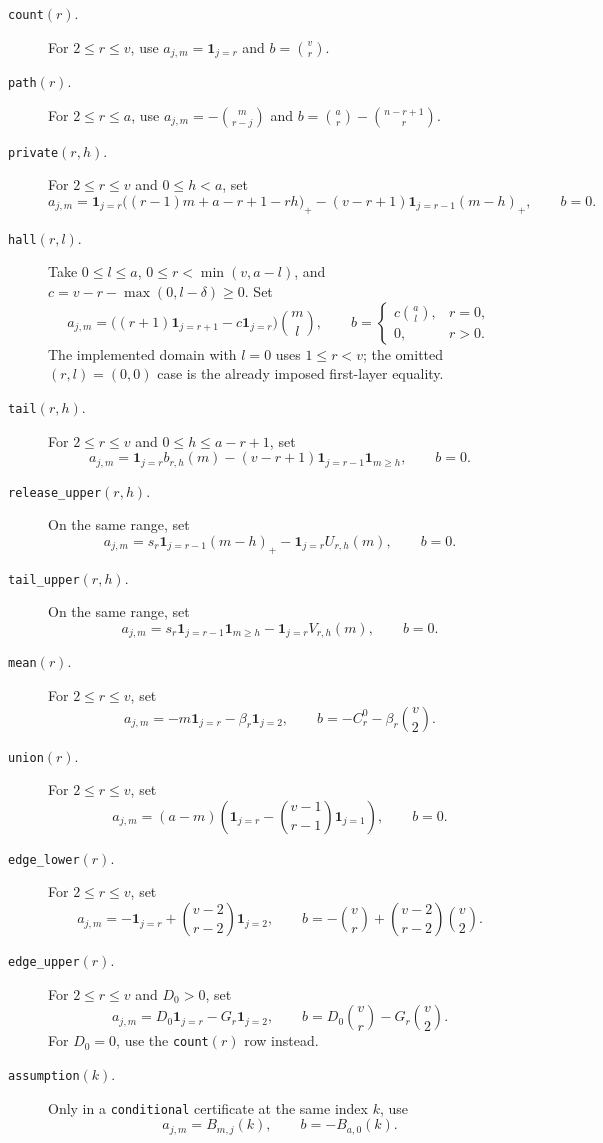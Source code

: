 \begin{description}
\item[\texttt{count}$(r)$.]
For $2\le r\le v$, use
$a_{j,m}=\mathbf{1}_{j=r}$ and $b=\binom vr$.

\item[\texttt{path}$(r)$.]
For $2\le r\le a$, use
$a_{j,m}=-\binom m{r-j}$ and
$b=\binom ar-\binom{n-r+1}{r}$.

\item[\texttt{private}$(r,h)$.]
For $2\le r\le v$ and $0\le h<a$, set
\[
 a_{j,m}=\mathbf{1}_{j=r}\bigl((r-1)m+a-r+1-rh\bigr)_+
 -(v-r+1)\mathbf{1}_{j=r-1}(m-h)_+,
 \qquad b=0.
\]

\item[\texttt{hall}$(r,l)$.]
Take $0\le l\le a$, $0\le r<\min(v,a-l)$, and
$c=v-r-\max(0,l-\delta)\ge0$.  Set
\[
 a_{j,m}=\bigl((r+1)\mathbf{1}_{j=r+1}-c\mathbf{1}_{j=r}\bigr)
                 \binom ml,\qquad
 b=\begin{cases}c\binom al,&r=0,\\0,&r>0.\end{cases}
\]
The implemented domain with $l=0$ uses $1\le r<v$; the omitted
$(r,l)=(0,0)$ case is the already imposed first-layer equality.

\item[\texttt{tail}$(r,h)$.]
For $2\le r\le v$ and $0\le h\le a-r+1$, set
\[
 a_{j,m}=\mathbf{1}_{j=r}b_{r,h}(m)
 -(v-r+1)\mathbf{1}_{j=r-1}\mathbf{1}_{m\ge h},\qquad b=0.
\]

\item[\texttt{release\_upper}$(r,h)$.]
On the same range, set
\[
 a_{j,m}=s_r\mathbf{1}_{j=r-1}(m-h)_+
            -\mathbf{1}_{j=r}U_{r,h}(m),\qquad b=0.
\]

\item[\texttt{tail\_upper}$(r,h)$.]
On the same range, set
\[
 a_{j,m}=s_r\mathbf{1}_{j=r-1}\mathbf{1}_{m\ge h}
            -\mathbf{1}_{j=r}V_{r,h}(m),\qquad b=0.
\]

\item[\texttt{mean}$(r)$.]
For $2\le r\le v$, set
\[
 a_{j,m}=-m\mathbf{1}_{j=r}-\beta_r\mathbf{1}_{j=2},\qquad
 b=-C_r^0-\beta_r\binom v2.
\]

\item[\texttt{union}$(r)$.]
For $2\le r\le v$, set
\[
 a_{j,m}=(a-m)\left(\mathbf{1}_{j=r}
                -\binom{v-1}{r-1}\mathbf{1}_{j=1}\right),\qquad b=0.
\]

\item[\texttt{edge\_lower}$(r)$.]
For $2\le r\le v$, set
\[
 a_{j,m}=-\mathbf{1}_{j=r}+\binom{v-2}{r-2}\mathbf{1}_{j=2},\qquad
 b=-\binom vr+\binom{v-2}{r-2}\binom v2.
\]

\item[\texttt{edge\_upper}$(r)$.]
For $2\le r\le v$ and $D_0>0$, set
\[
 a_{j,m}=D_0\mathbf{1}_{j=r}-G_r\mathbf{1}_{j=2},\qquad
 b=D_0\binom vr-G_r\binom v2.
\]
For $D_0=0$, use the \texttt{count}$(r)$ row instead.

\item[\texttt{assumption}$(k)$.]
Only in a \texttt{conditional} certificate at the same index $k$, use
\[
 a_{j,m}=B_{m,j}(k),\qquad b=-B_{a,0}(k).
\]
\end{description}


